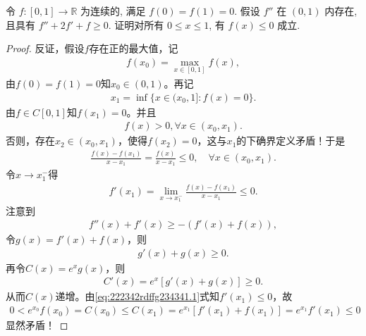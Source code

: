 \documentclass[../../main.tex]{subfiles}%
\begin{document}
\begin{example}
令 $f:[0,1] \to \mathbb{R}$ 为连续的, 满足 $f(0) = f(1) = 0$. 假设 $f''$ 在 $(0,1)$ 内存在, 且具有 $f''+2f'+f \geqslant 0$. 证明对所有 $0 \leqslant x \leqslant 1$, 有 $f(x) \leqslant 0$ 成立.
\end{example}
\begin{proof}

反证，假设$f$存在正的最大值，记
\begin{align*}
f(x_0) = \max_{x \in [0,1]} f(x),
\end{align*}
由$f(0) = f(1) = 0$知$x_0 \in (0,1)$。再记
\begin{align*}
x_1 = \inf \{ x \in (x_0,1] : f(x) = 0 \}.
\end{align*}
由$f \in C[0,1]$知$f(x_1) = 0$。并且
\begin{align*}
f(x) > 0, \forall x \in (x_0, x_1).
\end{align*}
否则，存在$x_2 \in (x_0, x_1)$，使得$f(x_2) = 0$，这与$x_1$的下确界定义矛盾！于是
\begin{align*}
\frac{f(x) - f(x_1)}{x - x_1} = \frac{f(x)}{x - x_1} \leqslant 0, \quad \forall x \in (x_0, x_1).
\end{align*}
令$x \to x_1^-$得
\begin{align}
f'(x_1) = \lim_{x \to x_1^-} \frac{f(x) - f(x_1)}{x - x_1} \leqslant 0. \label{eq:222342rdffg234341.1}
\end{align}
注意到
\begin{align*}
f''(x) + f'(x) \geqslant -(f'(x) + f(x)),
\end{align*}
令$g(x) = f'(x) + f(x)$，则
\begin{align*}
g'(x) + g(x) \geqslant 0.
\end{align*}
再令$C(x) = e^x g(x)$，则
\begin{align*}
C'(x) = e^x [g'(x) + g(x)] \geqslant 0.
\end{align*}
从而$C(x)$递增。由\eqref{eq:222342rdffg234341.1}式知$f'(x_1) \leqslant 0$，故
\begin{align*}
0 < e^{x_0} f(x_0) = C(x_0) \leqslant C(x_1) = e^{x_1} [f'(x_1) + f(x_1)] = e^{x_1} f'(x_1) \leqslant 0
\end{align*}
显然矛盾！

\end{proof}
\end{document}
